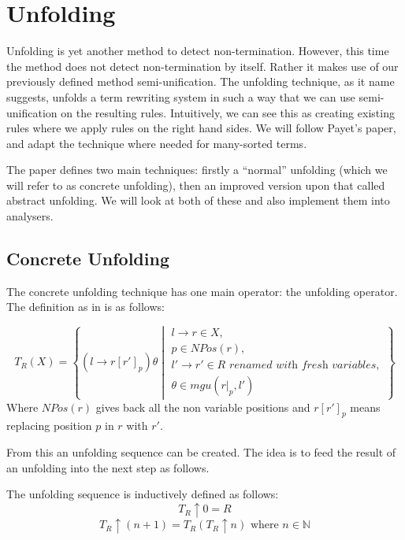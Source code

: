 \chapter{Unfolding}\label{unfolding}
Unfolding is yet another method to detect non-termination. However, this time the method does not detect non-termination by itself. Rather it makes use of our previously defined method semi-unification. The unfolding technique, as it name suggests, unfolds a term rewriting system in such a way that we can use semi-unification on the resulting rules. Intuitively, we can see this as creating existing rules where we apply rules on the right hand sides. We will follow Payet's paper\cite{Payet:Unfolding}, and adapt the technique where needed for many-sorted terms. 

The paper defines two main techniques: firstly a ``normal'' unfolding (which we will refer to as concrete unfolding), then an improved version upon that called abstract unfolding. We will look at both of these and also implement them into analysers. 

\section{Concrete Unfolding}
The concrete unfolding technique has one main operator: the unfolding operator. The definition as in \cite{Payet:Unfolding} is as follows:
\begin{definition}
\[
T_R(X) = \left\{ \left( l \rightarrow r\left[ r' \right]_p \right)\theta \middle\vert \begin{array}{l} 
l \rightarrow r \in X, \\
p \in \textit{NPos}(r), \\
l' \rightarrow r' \in R \textit{ renamed with fresh variables}, \\
\theta \in mgu(\left.r\right|_p, l')
\end{array}
\right\} 
\]
Where $\textit{NPos}(r)$ gives back all the non variable positions and $r\left[ r'\right]_p$ means replacing position $p$ in $r$ with $r'$. 
\end{definition}

From this an unfolding sequence can be created. The idea is to feed the result of an unfolding into the next step as follows. 
\begin{definition}
The unfolding sequence is inductively defined as follows:
$$T_R \uparrow 0 = R$$
$$T_R \uparrow (n + 1) = T_R(T_R \uparrow n) \text{ where } n \in \mathbb{N}$$ 
\end{definition}

